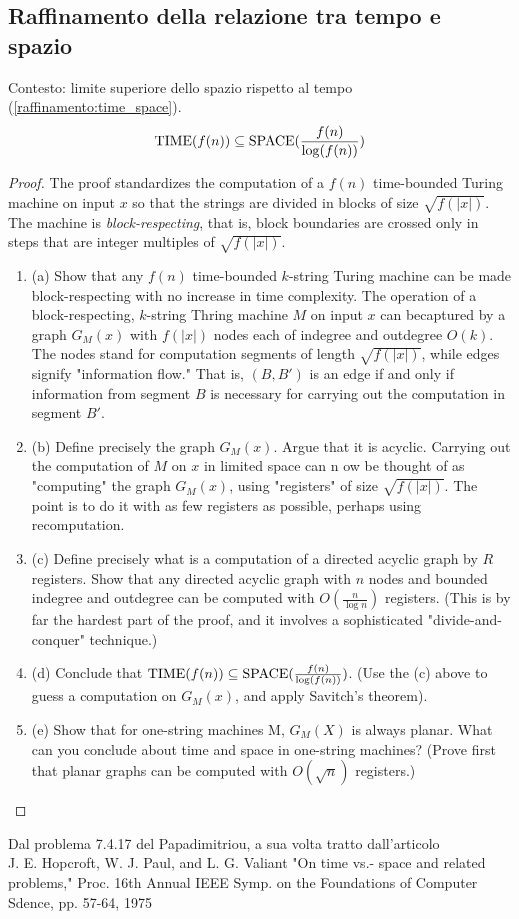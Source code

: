 \newpage
\subsection*{Raffinamento della relazione tra tempo e spazio}
\label{proof:raffinamento_time_space}
Contesto: limite superiore dello spazio rispetto al tempo (\ref{raffinamento:time_space}). \\
\[ 
\text{TIME}(f(n)) \subseteq \text{SPACE}{ ( \frac{f(n)}{\log(f(n))} ) } 
\]
\begin{proof}
The proof standardizes the computation of a 
$f(n)$ time-bounded Turing machine on input $x$ 
so that the strings are divided in blocks of size $\sqrt{f(|x|)}$. 
The machine is \textit{block-respecting}, that is, 
block boundaries are crossed only in steps 
that are integer multiples of $\sqrt{f(|x|)}$.
\begin{enumerate}

\item (a) Show that any $f(n)$ time-bounded $k$-string Turing machine 
can be made block-respecting with no increase in time complexity.
\subitem The operation of a block-respecting, $k$-string Thring machine $M$ on input $x$ 
can becaptured by a graph $G_M(x)$ with $f(|x|)$ nodes each of indegree and outdegree $O(k)$. \\
The nodes stand for computation segments of length $\sqrt{f(|x|)}$, while edges signify
"information flow." That is, $(B, B')$ is an edge if and only if information from segment
$B$ is necessary for carrying out the computation in segment $B'$.

\item (b) Define precisely the graph $G_M(x)$. Argue that it is acyclic.
\subitem Carrying out the computation of $M$ on $x$ in limited space can n ow be thought of as
"computing" the graph $G_M(x)$, using "registers" of size $\sqrt{f(|x|)}$. The point is to do
it with as few registers as possible, perhaps using recomputation.

\item (c) Define precisely what is a computation of a directed acyclic graph by $R$ registers.
Show that any directed acyclic graph with $n$ nodes and bounded indegree and outdegree 
can be computed with $O( \frac{n}{\log n} )$ registers. 
(This is by far the hardest part of the proof, 
and it involves a sophisticated "divide-and-conquer" technique.)

\item (d) Conclude that $\text{TIME}(f(n)) \subseteq \text{SPACE}{ ( \frac{f(n)}{\log(f(n))} ) }$. 
(Use the (c) above to guess a computation on $G_M(x)$, and apply Savitch's theorem).

\item (e) Show that for one-string machines M, $G_M(X)$ is always planar. What can you
conclude about time and space in one-string machines? (Prove first that planar graphs
can be computed with $O( \sqrt{n} )$ registers.)

\end{enumerate}
\end{proof}
Dal problema 7.4.17 del Papadimitriou, a sua volta tratto dall'articolo \\
J. E. Hopcroft, W. J. Paul, and L. G. Valiant "On time vs.- space and related
problems," Proc. 16th Annual IEEE Symp. on the Foundations of Computer
Sdence, pp. 57-64, 1975